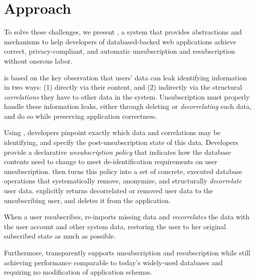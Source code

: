 \section{Approach}
To solve these challenges, we present \sys, a system that provides abstractions and mechanisms to
help developers of databased-backed web applications achieve correct, privacy-compliant, and
automatic unsubscription and resubscription without onerous labor.

\sys is based on the key observation that users' data can leak identifying information in two ways:
(1) directly via their content, and (2) indirectly via the structural \emph{correlations} they have
to other data in the system. 
Unsubscription must properly handle these information leaks, either through deleting or
\emph{decorrelating} such data, and do so while preserving
application correctness.

%
Using \sys, developers pinpoint exactly which data and correlations may be identifying, and
specify the post-unsubscription state of this data. Developers provide a declarative
\emph{unsubscription policy} that indicates how the database contents need to change to meet
de-identification requirements on user unsubscription.
%
\sys then turns this policy into a set of concrete, executed database operations that systematically
remove, anonymize, and structurally \emph{decorrelate} user data. \sys explicitly returns
decorrelated or removed user data to the unsubscribing user, and deletes it from the application.
%

%
When a user resubscribes, \sys re-imports missing data and \emph{recorrelates} the data with the
user account and other system data, restoring the user to her original subscribed state as much as
possible.

Furthermore, \sys transparently supports unsubscription and resubscription while still achieving performance
comparable to today’s widely-used databases and requiring no modification of application schemas.
